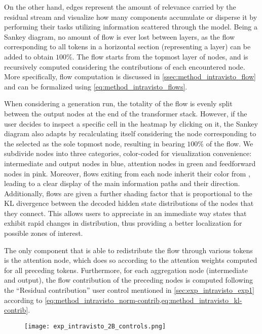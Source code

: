 On the other hand, edges represent the amount of relevance carried by the residual stream and visualize how many components accumulate or disperse it by performing their tasks utilizing information scattered through the model.
Being a Sankey diagram, no amount of flow is ever lost between layers, as the flow corresponding to all tokens in a horizontal section (representing a layer) can be added to obtain $100\%$.
The flow starts from the topmost layer of nodes, and is recursively computed considering the contributions of each encountered node.
More specifically, flow computation is discussed  in \cref{ssec:method_intravisto_flow} and can be formalized using \cref{eq:method_intravisto_flows}.

When considering a  generation run, the totality of the flow is evenly split between the output nodes at the end of the transformer stack.
However, if the user decides to inspect a specific cell in the heatmap by clicking on it, the Sankey diagram also adapts by recalculating itself considering the node corresponding to the selected as the sole topmost node, resulting in  bearing $100\%$ of the flow.
We subdivide nodes into three categories, color-coded for visualization convenience: intermediate and output nodes in blue, attention nodes in green and feedforward nodes in pink.
Moreover, flows exiting from each node inherit their color from , leading to a clear display of the main information paths and their direction.
Additionally, flows are given a further shading factor that is proportional to the KL divergence between the decoded hidden state distributions of the nodes that they connect.
This allows users to appreciate in an immediate way states that exhibit rapid changes in distribution, thus providing a better localization for possible zones of interest.

The only component that is able to redistribute the flow through various tokens is the attention node, which does so according to the attention weights computed for all preceding tokens.
Furthermore, for each aggregation node (intermediate and output), the flow contribution of the preceding nodes is computed following the ``Residual contribution'' user control mentioned in \cref{sec:exp_intravisto_exp1} according to \cref{eq:method_intravisto_norm-contrib,eq:method_intravisto_kl-contrib}.

\begin{figure}[t!]
    \centering
    \texttt{[image: exp\_intravisto\_2B\_controls.png]}
    \caption{}
    \label{fig:exp_intravisto_2_B}
\end{figure}

